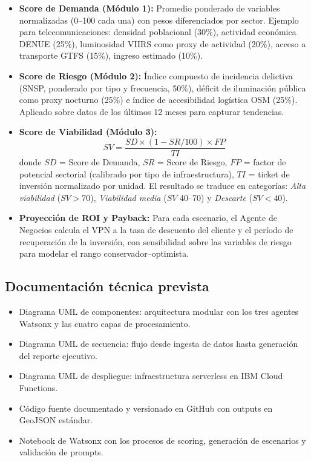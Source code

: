 \documentclass[12pt,a4paper]{article}
\begin{document}
\begin{itemize}[leftmargin=1.5cm, itemsep=4pt]
  \item \textbf{Score de Demanda (Módulo 1):} Promedio ponderado de variables normalizadas (0–100 cada una) con pesos diferenciados por sector. Ejemplo para telecomunicaciones: densidad poblacional (30\%), actividad económica DENUE (25\%), luminosidad VIIRS como proxy de actividad (20\%), acceso a transporte GTFS (15\%), ingreso estimado (10\%).

  \item \textbf{Score de Riesgo (Módulo 2):} Índice compuesto de incidencia delictiva (SNSP, ponderado por tipo y frecuencia, 50\%), déficit de iluminación pública como proxy nocturno (25\%) e índice de accesibilidad logística OSM (25\%). Aplicado sobre datos de los últimos 12 meses para capturar tendencias.

  \item \textbf{Score de Viabilidad (Módulo 3):}
  \[
    SV = \frac{SD \times (1 - SR/100) \times FP}{TI}
  \]
  donde $SD$ = Score de Demanda, $SR$ = Score de Riesgo, $FP$ = factor de potencial sectorial (calibrado por tipo de infraestructura), $TI$ = ticket de inversión normalizado por unidad. El resultado se traduce en categorías: \textit{Alta viabilidad} ($SV > 70$), \textit{Viabilidad media} ($SV$ 40–70) y \textit{Descarte} ($SV < 40$).

  \item \textbf{Proyección de ROI y Payback:} Para cada escenario, el Agente de Negocios calcula el VPN a la tasa de descuento del cliente y el período de recuperación de la inversión, con sensibilidad sobre las variables de riesgo para modelar el rango conservador–optimista.
\end{itemize}

\subsection{Documentación técnica prevista}

\begin{itemize}[leftmargin=1.5cm, itemsep=3pt]
  \item Diagrama UML de componentes: arquitectura modular con los tres agentes Watsonx y las cuatro capas de procesamiento.
  \item Diagrama UML de secuencia: flujo desde ingesta de datos hasta generación del reporte ejecutivo.
  \item Diagrama UML de despliegue: infraestructura serverless en IBM Cloud Functions.
  \item Código fuente documentado y versionado en GitHub con outputs en GeoJSON estándar.
  \item Notebook de Watsonx con los procesos de scoring, generación de escenarios y validación de prompts.
\end{itemize}
\end{document}
